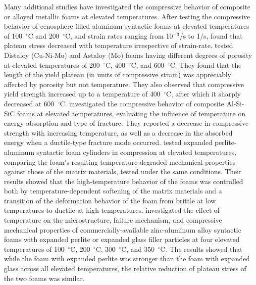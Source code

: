 \documentclass[review]{elsarticle}
\begin{document}
Many additional studies have investigated the compressive behavior of composite or alloyed metallic foams at elevated temperatures. After testing the compressive behavior of cenosphere-filled aluminum syntactic foams at elevated temperatures of 100~$^{\circ}\mathrm{C}$ and 200~$^{\circ}\mathrm{C}$, and strain rates ranging from 10$^{-3}$/s to 1/s, \cite{Mondal:2012} found that plateau stress decreased with temperature irrespective of strain-rate. \cite{Bekoz:2014} tested Distaloy (Cu-Ni-Mo) and Astaloy (Mo) foams having different degrees of porosity at elevated temperatures of 200~$^{\circ}\mathrm{C}$, 400~$^{\circ}\mathrm{C}$, and 600~$^{\circ}\mathrm{C}$. They found that the length of the yield plateau (in units of compressive strain) was appreciably affected by porosity but not temperature. They also observed that compressive yield strength increased up to a temperature of 400~$^{\circ}\mathrm{C}$, after which it sharply decreased at 600~$^{\circ}\mathrm{C}$. \cite{Liuetal2016} investigated the compressive behavior of composite Al-Si-SiC foams at elevated temperatures, evaluating the influence of temperature on energy absorption and type of fracture. They reported a decrease in compressive strength with increasing temperature, as well as a decrease in the absorbed energy when a ductile-type fracture mode occurred. \cite{Taherishargh2018} tested expanded perlite-aluminum syntactic foam cylinders in compression at elevated temperatures,  comparing the foam's resulting temperature-degraded mechanical properties against those of the matrix materials, tested under the same conditions. Their results showed that the high-temperature behavior of the foams was controlled both by temperature-dependent softening of the matrix materials and a transition of the deformation behavior of the foam from brittle at low temperatures to ductile at high temperatures. \cite{Linul:2019} investigated the effect of temperature on the microstructure, failure mechanism, and compressive mechanical properties of commercially-available zinc-aluminum alloy syntactic foams with expanded perlite or expanded glass filler particles at four elevated temperatures of 100~$^{\circ}\mathrm{C}$, 200~$^{\circ}\mathrm{C}$, 300~$^{\circ}\mathrm{C}$, and 350~$^{\circ}\mathrm{C}$. The results showed that while the foam with expanded perlite was stronger than the foam with expanded glass across all elevated temperatures, the relative reduction of plateau stress of the two foams was similar.
\end{document}
